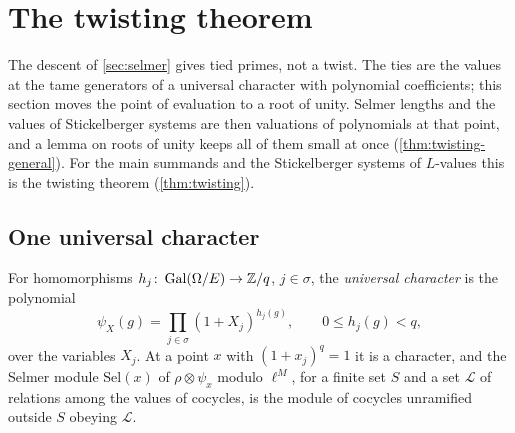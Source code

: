 \section{The twisting theorem}\label{sec:twisting}

The descent of \cref{sec:selmer} gives tied primes, not a twist. The ties are the values at the tame generators of a universal character with polynomial coefficients; this section
moves the point of evaluation to a root of unity. Selmer lengths and the values of Stickelberger systems are then valuations of polynomials at that point, and a lemma on roots of unity
keeps all of them small at once (\cref{thm:twisting-general}). For the main summands and the Stickelberger systems of $L$-values this is the twisting theorem
(\cref{thm:twisting}).

\subsection{One universal character}\label{ss:universal-char}
For homomorphisms $h_j\colon\operatorname{Gal}(\Omega/E)\to\mathbb{Z}/q$, $j\in\sigma$, the \emph{universal character} is the polynomial
\[
  \psi_X(g)=\prod_{j\in\sigma}(1+X_j)^{h_j(g)},\qquad 0\le h_j(g)<q,
\]
over the variables $X_j$. At a point $x$ with $(1+x_j)^q=1$ it is a character, and the Selmer module $\mathrm{Sel}(x)$ of $\rho\otimes\psi_x$ modulo $\ell^M$, for a finite set $S$ and a set $\mathcal L$ of relations among the values of cocycles,
is the module of cocycles unramified outside $S$ obeying $\mathcal L$.

